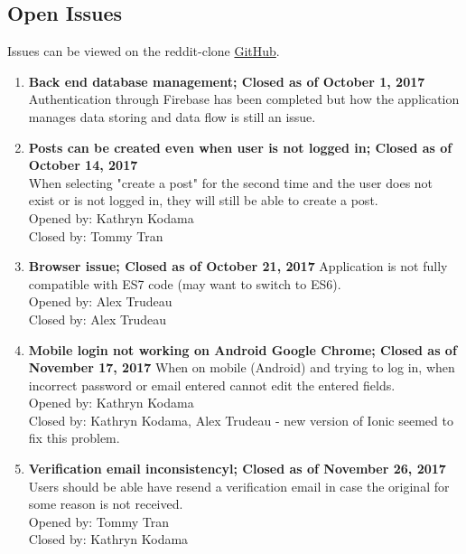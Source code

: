 \documentclass[12pt,fleqn]{article}
\begin{document}
{\color{red}\subsection {Open Issues}
Issues can be viewed on the reddit-clone \href{https://gitlab.cas.mcmaster.ca/trudeaua/reddit-clone/issues?scope=all&utf8=%E2%9C%93&state=all}{GitHub}. \\
\begin{enumerate}
\item \textbf{Back end database management; Closed as of October 1, 2017} \\
Authentication through Firebase has been completed but how the application manages data storing and data flow is still an issue. \\

\item \textbf{Posts can be created even when user is not logged in; Closed as of October 14, 2017}\\
When selecting "create a post" for the second time and the user does not exist or is not logged in, they will still be able to create a post. \\
Opened by: Kathryn Kodama \\
Closed by: Tommy Tran \\

\item \textbf{Browser issue; Closed as of October 21, 2017}
Application is not fully compatible with ES7 code (may want to switch to ES6).\\
Opened by: Alex Trudeau \\
Closed by: Alex Trudeau \\

\item \textbf{Mobile login not working on Android Google Chrome; Closed as of November 17, 2017}
When on mobile (Android) and trying to log in, when incorrect password or email entered cannot edit the entered fields. \\
Opened by: Kathryn Kodama \\
Closed by: Kathryn Kodama, Alex Trudeau - new version of Ionic seemed to fix this problem. \\

\item \textbf{Verification email inconsistencyl; Closed as of November 26, 2017} \\
Users should be able have resend a verification email in case the original for some reason is not received. \\
Opened by: Tommy Tran \\
Closed by: Kathryn Kodama \\


\end{enumerate}}
\end{document}
